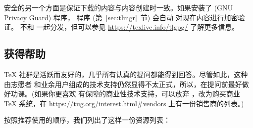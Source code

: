 \documentclass{article}
\begin{document}
安全的另一个方面是保证下载的内容与内容创建时一致。如果安装了 
(GNU Privacy Guard) 程序， 程序 (第~\ref{sec:tlmgr}~节) 会自动
对现在内容进行加密验证。 不和 \TL{} 一起分发，但可以参见
\url{https://texlive.info/tlgpg/} 了解更多信息。

\subsection{获得帮助}
\label{sec:help}

\TeX{} 社群是活跃而友好的，几乎所有认真的提问都能得到回答。尽管如此，这种由志愿者
和业余用户组成的技术支持仍然显得不太正式，所以，在提问前最好做好功课。(如果你更喜欢
有保障的商业性技术支持，可以放弃 \TL{}，改为购买商业 \TeX{} 系统，在
\url{https://tug.org/interest.html#vendors} 上有一份销售商的列表。)

按照推荐使用的顺序，我们列出了这样一份资源列表：
\end{document}
